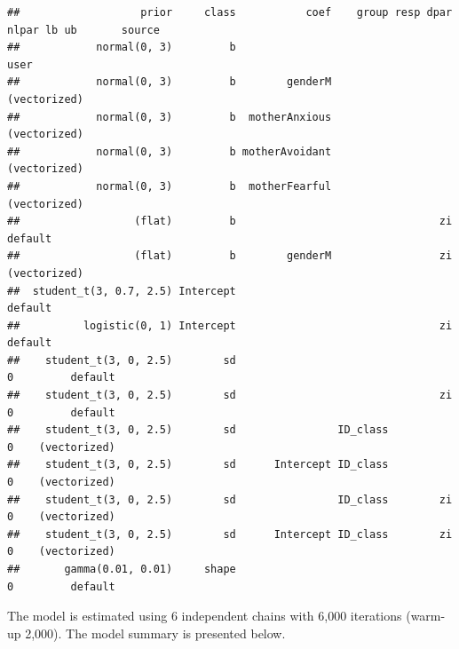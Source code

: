 \documentclass[
]{book}
\begin{document}
\begin{verbatim}
##                   prior     class           coef    group resp dpar nlpar lb ub       source
##            normal(0, 3)         b                                                       user
##            normal(0, 3)         b        genderM                                (vectorized)
##            normal(0, 3)         b  motherAnxious                                (vectorized)
##            normal(0, 3)         b motherAvoidant                                (vectorized)
##            normal(0, 3)         b  motherFearful                                (vectorized)
##                  (flat)         b                                zi                  default
##                  (flat)         b        genderM                 zi             (vectorized)
##  student_t(3, 0.7, 2.5) Intercept                                                    default
##          logistic(0, 1) Intercept                                zi                  default
##    student_t(3, 0, 2.5)        sd                                          0         default
##    student_t(3, 0, 2.5)        sd                                zi        0         default
##    student_t(3, 0, 2.5)        sd                ID_class                  0    (vectorized)
##    student_t(3, 0, 2.5)        sd      Intercept ID_class                  0    (vectorized)
##    student_t(3, 0, 2.5)        sd                ID_class        zi        0    (vectorized)
##    student_t(3, 0, 2.5)        sd      Intercept ID_class        zi        0    (vectorized)
##       gamma(0.01, 0.01)     shape                                          0         default
\end{verbatim}

The model is estimated using 6 independent chains with 6,000 iterations (warm-up 2,000). The model summary is presented below.
\end{document}
